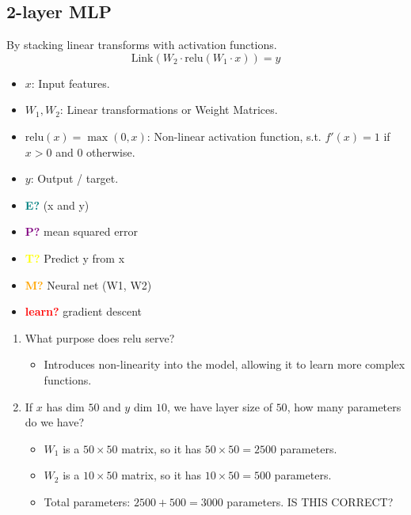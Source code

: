 \subsection{2-layer MLP}
\begin{definition} By stacking linear transforms with activation functions.
    \begin{equation}
        \text{Link}(W_2 \cdot \text{relu}(W_1 \cdot x)) = y
    \end{equation}
    \begin{itemize}
        \item $x$: Input features.
        \item $W_1, W_2$: Linear transformations or Weight Matrices.
        \item $\text{relu}(x) = \max(0,x)$: Non-linear activation function, s.t. $f'(x) = 1$ if $x > 0$ and $0$ otherwise.
        \item $y$: Output / target. 
    \end{itemize}
    \vspace{1em}

    \begin{itemize}
        \item \textcolor{teal}{\textbf{E?}} (x and y)
        \item \textcolor{purple}{\textbf{P?}} mean squared error
        \item \textcolor{yellow}{\textbf{T?}} Predict y from x
        \item \textcolor{orange}{\textbf{M?}} Neural net (W1, W2)
        \item \textcolor{red}{\textbf{learn?}} gradient descent
    \end{itemize}
\end{definition}

\begin{example}
    \begin{enumerate}
        \item What purpose does relu serve? 
            \begin{itemize}
                \item Introduces non-linearity into the model, allowing it to learn more complex functions.
            \end{itemize}       
        \item If $x$ has dim $50$ and $y$ dim $10$, we have layer size of $50$, how many parameters do we have?
            \begin{itemize}
                \item $W_1$ is a $50 \times 50$ matrix, so it has $50 \times 50 = 2500$ parameters.
                \item $W_2$ is a $10 \times 50$ matrix, so it has $10 \times 50 = 500$ parameters.
                \item Total parameters: $2500 + 500 = 3000$ parameters. IS THIS CORRECT?
            \end{itemize} 
    \end{enumerate}
\end{example}
\newpage

